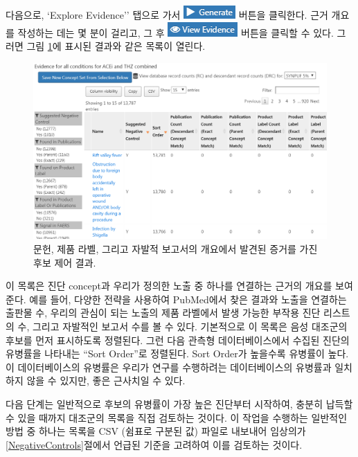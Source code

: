 \documentclass[11pt]{book}
\theoremstyle{definition}
\theoremstyle{definition}
\theoremstyle{definition}
\theoremstyle{remark}
\begin{document}
다음으로, `Explore Evidence'' 탭으로 가서
\includegraphics{images/MethodValidity/generate.png} 버튼을 클릭한다.
근거 개요를 작성하는 데는 몇 분이 걸리고, 그 후
\includegraphics{images/MethodValidity/viewEvidence.png} 버튼을 클릭할
수 있다. 그러면 그림 \ref{fig:candidateNcs}에 표시된 결과와 같은 목록이
열린다.

\begin{figure}

{\centering \includegraphics[width=1\linewidth]{images/MethodValidity/candidateNcs} 

}

\caption{문헌, 제품 라벨, 그리고 자발적 보고서의 개요에서 발견된 증거를 가진 후보 제어 결과.}\label{fig:candidateNcs}
\end{figure}

이 목록은 진단 concept과 우리가 정의한 노출 중 하나를 연결하는 근거의
개요를 보여준다. 예를 들어, 다양한 전략을 사용하여 PubMed에서 찾은
결과와 노출을 연결하는 출판물 수, 우리의 관심이 되는 노출의 제품
라벨에서 발생 가능한 부작용 진단 리스트의 수, 그리고 자발적인 보고서
수를 볼 수 있다. 기본적으로 이 목록은 음성 대조군의 후보를 먼저
표시하도록 정렬된다. 그런 다음 관측형 데이터베이스에서 수집된 진단의
유병률을 나타내는 ``Sort Order''로 정렬된다. Sort Order가 높을수록
유병률이 높다. 이 데이터베이스의 유병률은 우리가 연구를 수행하려는
데이터베이스의 유병률과 일치하지 않을 수 있지만, 좋은 근사치일 수 있다.

다음 단계는 일반적으로 후보의 유병률이 가장 높은 진단부터 시작하여,
충분히 납득할 수 있을 때까지 대조군의 목록을 직접 검토하는 것이다. 이
작업을 수행하는 일반적인 방법 중 하나는 목록을 CSV (쉼표로 구분된 값)
파일로 내보내어 임상의가 \ref{NegativeControls}절에서 언급된 기준을
고려하여 이를 검토하는 것이다.
\end{document}
